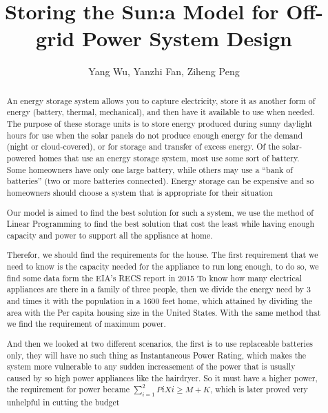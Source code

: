\documentclass[UTF-8]{article}
\title{Storing the Sun:a Model for Off-grid Power System Design}
\author{Yang Wu, Yanzhi Fan, Ziheng Peng}
\begin{document}
 
 

    \Large
    \maketitle
    \begin{abstract}
       \Large An energy storage system allows you to capture electricity, store it as another form of energy (battery, thermal, mechanical), 
       and then have it available to use when needed. The purpose of these storage units is to store energy produced during sunny daylight hours for use when the solar 
       panels do not produce enough energy for the demand (night or cloud-covered), or for storage and transfer of excess energy. Of the solar-powered homes that use an energy storage system,
        most use some sort of battery. Some homeowners have only one large battery, while others may use a “bank of batteries” (two or more batteries connected). Energy storage can be expensive
         and so homeowners should choose a system that is appropriate for their situation \par
         Our model is aimed to find the best solution for such a system, we use the method of Linear Programming to find the best solution that
          cost the least while having enough capacity and power to support all the appliance at home.\par
        Therefor, we should find the requirements for the house. The first requirement that we need to know 
        is the capacity needed for the appliance to run long enough, to do so, we find some data form the
        EIA's RECS report in 2015 To 
        know how many electrical appliances are there in a family of three people, then we divide the energy need by 
        3 and times it with the population in a 1600 feet home, which attained by dividing the area with the 
        Per capita housing size in the United States. With the same method that we find the requirement 
        of maximum power.\par 
        And then we looked at two different scenarios, the first is to use replaceable  batteries only,
        they will have no such thing as Instantaneous Power Rating, which makes the system more vulnerable
        to any sudden increasement  of the power that is usually caused by so high power appliances like 
        the hairdryer. So it must have a higher power, the requirement for power became $\sum_{i=1}^2PiXi\geq M+K$, which is later proved very unhelpful in cutting the budget\par

\end{abstract}
\end{document}
